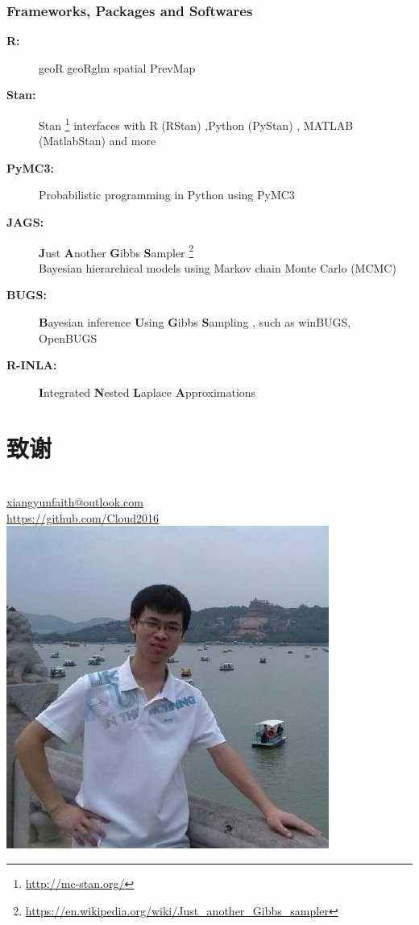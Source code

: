\documentclass[xcolor=x11names,UTF8]{ctexbeamer}
\begin{document}
\begin{frame}[allowframebreaks]
\frametitle{Frameworks, Packages and Softwares}

\begin{description}
\item[\textbf{R:}] geoR geoRglm spatial PrevMap \\
\citet{R-geoR,R-geoRglm,R-spatial,Giorgi2016}

\item[\textbf{Stan:}] Stan \footnote{\scriptsize \url{http://mc-stan.org/} }  
interfaces with R (RStan) ,Python (PyStan) , MATLAB (MatlabStan) 
and  more \\ \citet{Stan2015,Stan2017}

\item[\textbf{PyMC3:}] Probabilistic programming in Python using PyMC3 \\ \citet{Salvatier2016}

\item[\textbf{JAGS:}] \textbf{J}ust \textbf{A}nother \textbf{G}ibbs \textbf{S}ampler \footnote{\scriptsize \url{https://en.wikipedia.org/wiki/Just_another_Gibbs_sampler}} \\
Bayesian hierarchical models using Markov chain Monte Carlo (MCMC)
\item[\textbf{BUGS:}] \textbf{B}ayesian inference \textbf{U}sing \textbf{G}ibbs \textbf{S}ampling ,
such as winBUGS, OpenBUGS 
\item[\textbf{R-INLA:}] \textbf{I}ntegrated \textbf{N}ested \textbf{L}aplace \textbf{A}pproximations \\
\citet{Rue2009,R-INLA,Rue2017arXiv}
\end{description}


\end{frame}

\section*{致谢}

\begin{frame}
\centering
\color{red}
\Huge {}\\
\bigskip
\color{Blue4}
\normalsize
\href{mailto:me@somewhere.com}{xiangyunfaith@outlook.com} \\
\href{https://github.com/Cloud2016}{https://github.com/Cloud2016} \\
\bigskip
\includegraphics[width=10ex,interpolate=true]{me}
\end{frame}


\begin{frame}[allowframebreaks]


\end{frame}
\end{document}
